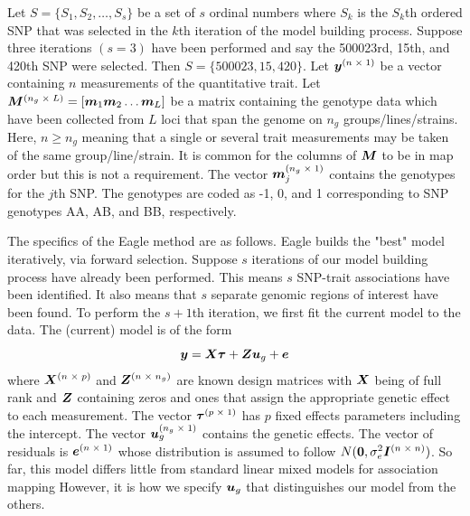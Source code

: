 \documentclass{nature}
\begin{document}
Let $S = \{ S_1, S_2, \ldots, S_s\}$ be a set of $s$ ordinal numbers where $S_k$ is the $S_k$th ordered SNP that was 
selected in the $k$th iteration of the model building process. Suppose three iterations  $(s=3)$
have been performed and say the 500023rd, 15th, and 420th
SNP were selected. Then $S=\{500023, 15, 420\}$. 
Let $\bm{y}^{(n \; \times \;1)}$ be a vector containing $n$ measurements of the quantitative trait. 
Let $\bm{M}^{(n_g \; \times \; L)} = [\bm{m}_1 \bm{m}_2 \ldots \bm{m}_L]$ be a matrix containing the genotype data which have been collected 
from $L$ loci that span the genome on $n_g$ groups/lines/strains.  Here, $n \geq n_g$ meaning that a single or several trait measurements 
may be taken of the same group/line/strain. 
 It is common for the columns of $\bm{M}$ to be in map order but this is not a requirement. 
The vector $\bm{m}_j^{(n_g \; \times \; 1)}$ contains the genotypes for the $j$th SNP. 
The genotypes are coded as -1, 0, and 1 corresponding to SNP genotypes AA, AB, and BB, respectively. 

The specifics of the Eagle method are as follows. 
Eagle builds the "best" model iteratively, via forward selection. 
Suppose $s$ iterations of our model building process have already been performed. This means $s$ SNP-trait 
associations have been identified.  It also means that $s$ separate genomic regions of interest have been found.  
To perform the $s+1$th  iteration, we first fit the current model to the data. 
The (current) model is of the form 
\begin{equation}
\label{eq1}
\bm{y} = \bm{X} \bm{\tau} + \bm{Z} \bm{u}_g + \bm{e}
\end{equation}
where 
$\bm{X}^{(n \; \times \; p)}$ and $\bm{Z}^{( n \; \times \; n_g)}$ are known design matrices with $\bm{X}$ being of full rank and $\bm{Z}$ 
containing zeros and ones that assign the appropriate genetic effect to each measurement. 
The vector 
$\bm{\tau}^{(p \; \times \; 1)}$ has $p$ fixed effects parameters including the intercept. The vector 
$\bm{u}_g^{(n_g \; \times \; 1)}$ contains the 
genetic effects. The vector of residuals is 
$\bm{e}^{(n \; \times \;1)}$ whose distribution is assumed to follow $N(\bm{0}, \sigma^2_e \bm{I}^{(n \; \times \; n)})$. 
So far,  this model differs little from standard linear mixed models for association mapping \cite{yu2006unified,zhao2007arabidopsis} 
However, 
it is how we specify $\bm{u}_g$ that distinguishes our model from the others. 
\end{document}
